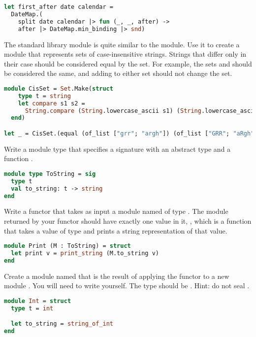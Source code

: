 \begin{lstlisting}[language=OCaml]
let first_after date calendar =
  DateMap.(
    split date calendar |> fun (_, _, after) ->
    after |> DateMap.min_binding |> snd)
\end{lstlisting}

\problem[sets]
The standard library  module is quite similar to the  module. Use it to create a module that represents sets of case-insensitive strings. Strings that differ only in their case should be considered equal by the set. For example, the sets  and  should be considered the same, and adding  to either set should not change the set.

\begin{lstlisting}[language=OCaml]
module CisSet = Set.Make(struct
    type t = string
    let compare s1 s2 =
      String.compare (String.lowercase_ascii s1) (String.lowercase_ascii s2)
  end)

let _ = CisSet.(equal (of_list ["grr"; "argh"]) (of_list ["GRR"; "aRgh"]))
\end{lstlisting}

\problem[ToString]
Write a module type  that specifies a signature with an abstract type  and a function .

\begin{lstlisting}[language=OCaml]
module type ToString = sig
  type t
  val to_string: t -> string
end
\end{lstlisting}

\problem[Print]
Write a functor  that takes as input a module named  of type . The module returned by your functor should have exactly one value in it, , which is a function that takes a value of type  and prints a string representation of that value.

\begin{lstlisting}[language=OCaml]
module Print (M : ToString) = struct
  let print v = print_string (M.to_string v)
end
\end{lstlisting}

Create a module named  that is the result of applying the functor  to a new module . You will need to write  yourself. The type  should be . Hint: do not seal .

\begin{lstlisting}[language=OCaml]
module Int = struct
  type t = int

  let to_string = string_of_int
end
\end{lstlisting}

